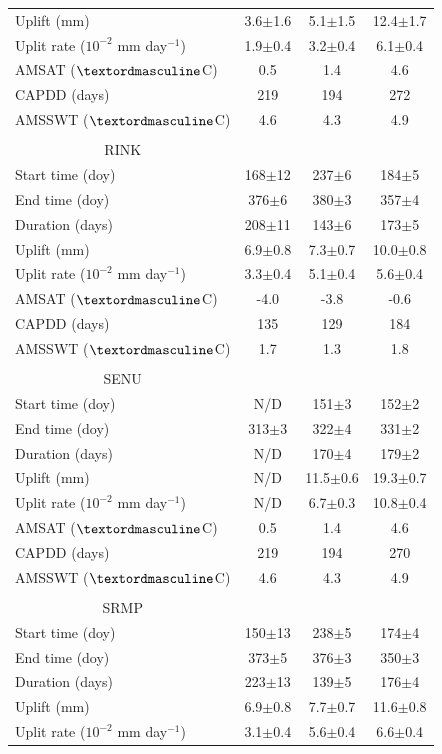 \begin{center}
\begin{ThreePartTable}
\begin{longtable}{lccc}
Uplift (mm)&3.6$\pm$1.6&5.1$\pm$1.5&12.4$\pm$1.7\\
Uplit rate ($10^{-2}$ mm day$^{-1}$)&1.9$\pm$0.4&3.2$\pm$0.4&6.1$\pm$0.4\\
AMSAT ($\textordmasculine$C)&0.5&1.4&4.6\\
CAPDD (days)&219&194&272\\
AMSSWT ($\textordmasculine$C)&4.6&4.3&4.9\\
&  &  & \\
\multicolumn{1}{c}{RINK} & & & \\
Start time (doy)&168$\pm$12&237$\pm$6&184$\pm$5\\
End time (doy)&376$\pm$6&380$\pm$3&357$\pm$4\\
Duration (days)&208$\pm$11&143$\pm$6&173$\pm$5\\
Uplift (mm)&6.9$\pm$0.8&7.3$\pm$0.7&10.0$\pm$0.8\\
Uplit rate ($10^{-2}$ mm day$^{-1}$)&3.3$\pm$0.4&5.1$\pm$0.4&5.6$\pm$0.4\\
AMSAT ($\textordmasculine$C)&-4.0&-3.8&-0.6\\
CAPDD (days)&135&129&184\\
AMSSWT ($\textordmasculine$C)&1.7&1.3&1.8\\
&  &  & \\
\multicolumn{1}{c}{SENU} & & & \\
Start time (doy)&N/D&151$\pm$3&152$\pm$2\\
End time (doy)&313$\pm$3&322$\pm$4&331$\pm$2\\
Duration (days)&N/D&170$\pm$4&179$\pm$2\\
Uplift (mm)&N/D&11.5$\pm$0.6&19.3$\pm$0.7\\
Uplit rate ($10^{-2}$ mm day$^{-1}$)&N/D&6.7$\pm$0.3&10.8$\pm$0.4\\
AMSAT ($\textordmasculine$C)&0.5&1.4&4.6\\
CAPDD (days)&219&194&270\\
AMSSWT ($\textordmasculine$C)&4.6&4.3&4.9\\
&  &  & \\	
\multicolumn{1}{c}{SRMP} & & & \\
Start time (doy)&150$\pm$13&238$\pm$5&174$\pm$4\\
End time (doy)&373$\pm$5&376$\pm$3&350$\pm$3\\
Duration (days)&223$\pm$13&139$\pm$5&176$\pm$4\\
Uplift (mm)&6.9$\pm$0.8&7.7$\pm$0.7&11.6$\pm$0.8\\
Uplit rate ($10^{-2}$ mm day$^{-1}$)&3.1$\pm$0.4&5.6$\pm$0.4&6.6$\pm$0.4\\

\end{longtable}
\end{ThreePartTable}
\end{center}
